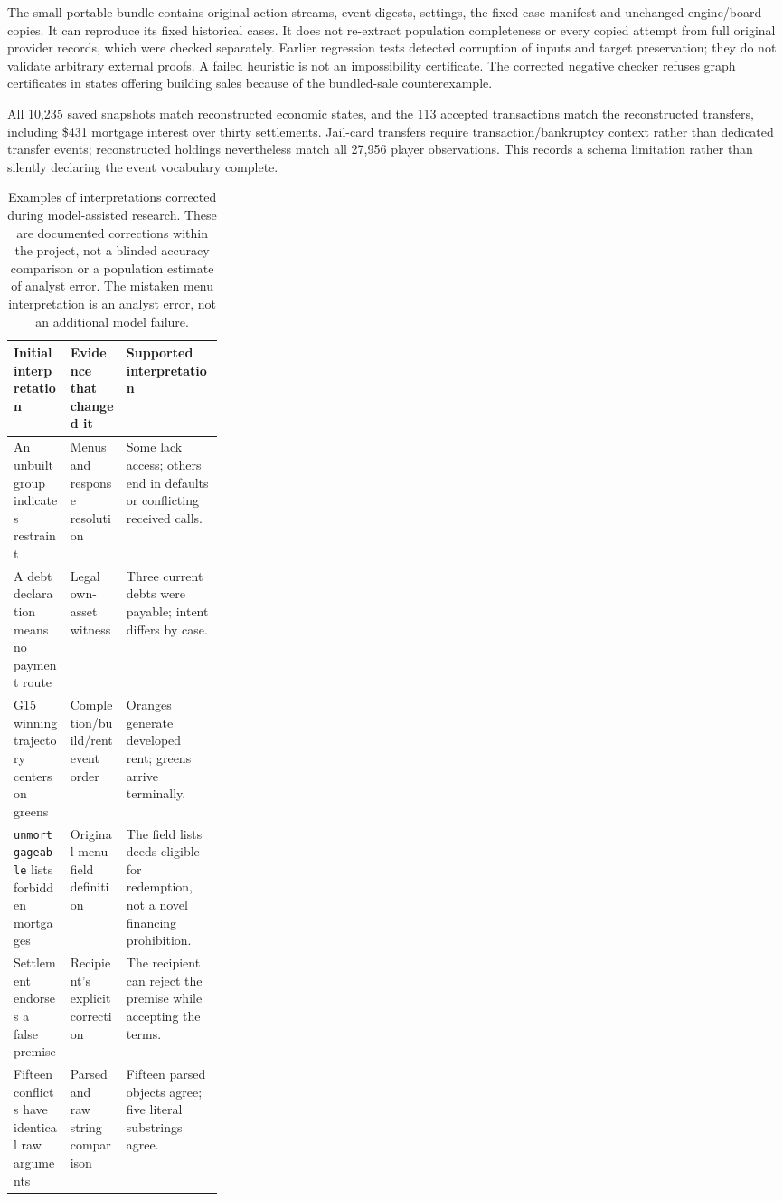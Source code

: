 The small portable bundle contains original action streams, event digests, settings, the fixed case manifest and unchanged engine/board copies. It can reproduce its fixed historical cases. It does not re-extract population completeness or every copied attempt from full original provider records, which were checked separately. Earlier regression tests detected corruption of inputs and target preservation; they do not validate arbitrary external proofs. A failed heuristic is not an impossibility certificate. The corrected negative checker refuses graph certificates in states offering building sales because of the bundled-sale counterexample.

All 10,235 saved snapshots match reconstructed economic states, and the 113 accepted transactions match the reconstructed transfers, including \$431 mortgage interest over thirty settlements. Jail-card transfers require transaction/bankruptcy context rather than dedicated transfer events; reconstructed holdings nevertheless match all 27,956 player observations. This records a schema limitation rather than silently declaring the event vocabulary complete.

\begin{table}[htbp]
\centering\small
\begin{tabularx}{\linewidth}{@{}L{0.27\linewidth}YY@{}}
\toprule
Initial interpretation & Evidence that changed it & Supported interpretation\\
\midrule
An unbuilt group indicates restraint & Menus and response resolution & Some lack access; others end in defaults or conflicting received calls.\\
A debt declaration means no payment route & Legal own-asset witness & Three current debts were payable; intent differs by case.\\
G15 winning trajectory centers on greens & Completion/build/rent event order & Oranges generate developed rent; greens arrive terminally.\\
\texttt{unmortgageable} lists forbidden mortgages & Original menu field definition & The field lists deeds eligible for redemption, not a novel financing prohibition.\\
Settlement endorses a false premise & Recipient's explicit correction & The recipient can reject the premise while accepting the terms.\\
Fifteen conflicts have identical raw arguments & Parsed and raw string comparison & Fifteen parsed objects agree; five literal substrings agree.\\
\bottomrule
\end{tabularx}
\caption{Examples of interpretations corrected during model-assisted research. These are documented corrections within the project, not a blinded accuracy comparison or a population estimate of analyst error. The mistaken menu interpretation is an analyst error, not an additional model failure.}
\end{table}


